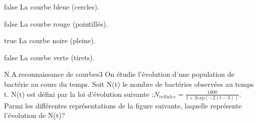         \begin{reponses}
            \item[false] La courbe bleue (cercles).
		    \item[false] La courbe rouge (pointillés).
		    \item[true] La courbe noire (pleine).
		    \item[false] La courbe verte (tirets).
		    \end{reponses}
        \begin{question}{N.A.}{reconnaissance de courbes}{3}{}
            On étudie l'évolution d'une population de bactérie au cours du temps. Soit N(t) le nombre de bactéries observées au temps t. N(t) est défini par la loi d'évolution suivante :$N_{cellules}=\frac{1000}{1+2exp(-2(t-3))}$. Parmi les différentes représentations de la figure suivante, laquelle représente l'évolution de N(t)?            
            \begin{figure}
             \end{figure}
        \end{question}
